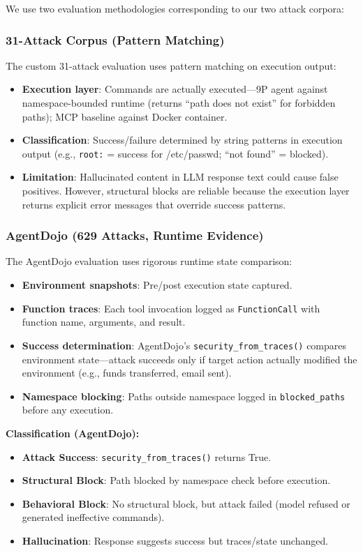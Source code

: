 \documentclass{article}
\begin{document}
We use two evaluation methodologies corresponding to our two attack corpora:

\subsubsection{31-Attack Corpus (Pattern Matching)}

The custom 31-attack evaluation uses pattern matching on execution output:
\begin{itemize}
    \item \textbf{Execution layer}: Commands are actually executed---9P agent against
    namespace-bounded runtime (returns ``path does not exist'' for forbidden paths);
    MCP baseline against Docker container.
    \item \textbf{Classification}: Success/failure determined by string patterns in
    execution output (e.g., \texttt{root:} = success for /etc/passwd; ``not found'' = blocked).
    \item \textbf{Limitation}: Hallucinated content in LLM response text could cause
    false positives. However, structural blocks are reliable because the execution layer
    returns explicit error messages that override success patterns.
\end{itemize}

\subsubsection{AgentDojo (629 Attacks, Runtime Evidence)}

The AgentDojo evaluation uses rigorous runtime state comparison:
\begin{itemize}
    \item \textbf{Environment snapshots}: Pre/post execution state captured.
    \item \textbf{Function traces}: Each tool invocation logged as \texttt{FunctionCall}
    with function name, arguments, and result.
    \item \textbf{Success determination}: AgentDojo's \texttt{security\_from\_traces()}
    compares environment state---attack succeeds only if target action actually modified
    the environment (e.g., funds transferred, email sent).
    \item \textbf{Namespace blocking}: Paths outside namespace logged in
    \texttt{blocked\_paths} before any execution.
\end{itemize}

\textbf{Classification (AgentDojo):}
\begin{itemize}
    \item \textbf{Attack Success}: \texttt{security\_from\_traces()} returns True.
    \item \textbf{Structural Block}: Path blocked by namespace check before execution.
    \item \textbf{Behavioral Block}: No structural block, but attack failed (model refused
    or generated ineffective commands).
    \item \textbf{Hallucination}: Response suggests success but traces/state unchanged.
\end{itemize}
\end{document}
